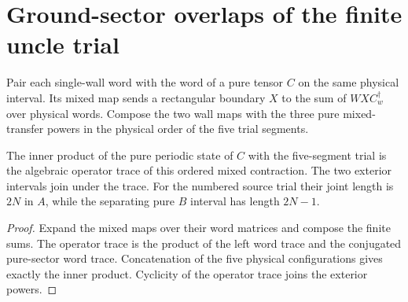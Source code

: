 \section{Ground-sector overlaps of the finite uncle trial}
\label{sec:uncle_trial_ground_overlap}

\begin{definition}
    \label{def:uncle_trial_mixed_contraction}
    \leanok
    Pair each single-wall word with the word of a pure tensor $C$
    on the same physical interval. Its mixed map sends a rectangular
    boundary $X$ to the sum of $W X C_w^\dagger$ over physical words.
    Compose the two wall maps with the three pure mixed-transfer powers
    in the physical order of the five trial segments.
\end{definition}

\begin{lemma}
    \label{lem:uncle_trial_overlap_trace}
    \leanok
    The inner product of the pure periodic state of $C$ with the
    five-segment trial is the algebraic operator trace of this ordered
    mixed contraction. The two exterior intervals join under the trace.
    For the numbered source trial their joint length is $2N$ in $A$,
    while the separating pure $B$ interval has length $2N-1$.
\end{lemma}
\begin{proof}
    \leanok
    Expand the mixed maps over their word matrices and compose the
    finite sums. The operator trace is the product of the left word trace
    and the conjugated pure-sector word trace. Concatenation of the five
    physical configurations gives exactly the inner product.
    Cyclicity of the operator trace joins the exterior powers.
\end{proof}

